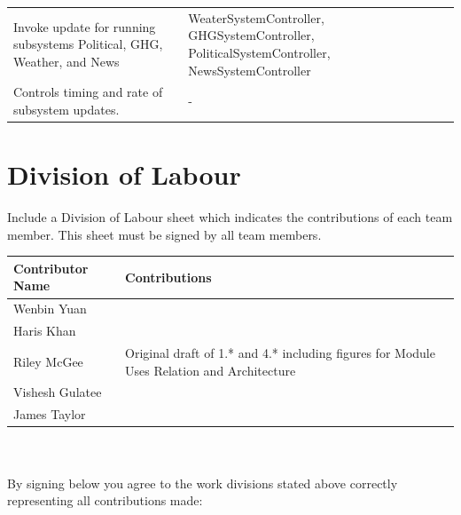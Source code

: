 \documentclass[]{article}
\begin{document}
\begin{enumerate}[1.]
\begin{tabular}{|p{10cm}|p{4cm}|}
	    Invoke update for running subsystems Political, GHG, Weather, and News & WeaterSystemController, GHGSystemController, PoliticalSystemController, NewsSystemController \\
		Controls timing and rate of subsystem updates. & - \\
	    \hline
	  \end{tabular}

	
\end{enumerate}

\appendix
\section{Division of Labour}
\label{sec:division_of_labour}
Include a Division of Labour sheet which indicates the contributions of each team member. This sheet must be signed by all team members.

\begin{tabular}{ | l | l | }
\hline
	\textbf{Contributor Name} & \textbf{Contributions}  \\
  	\hline
  	Wenbin Yuan & \\
  	\hline
  	Haris Khan &  \\
  	\hline
  	Riley McGee & Original draft of 1.* and 4.* including figures for Module Uses Relation and Architecture\\
  	\hline
  	Vishesh Gulatee & \\
  	\hline
  	James Taylor & \\
  	\hline
\end{tabular}
\\
\\
By signing below you agree to the work divisions stated above correctly representing all contributions made:



\newpage
\end{document}
